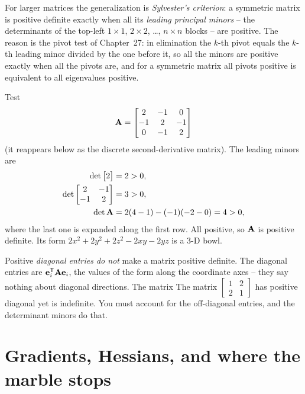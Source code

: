 For larger matrices the generalization is \emph{Sylvester's criterion}: a
symmetric matrix is positive definite exactly when all its \emph{leading principal
minors} -- the determinants of the top-left $1\times1$, $2\times2$, \dots, $n\times
n$ blocks -- are positive. The reason is the pivot test of Chapter~27: in elimination
the $k$-th pivot equals the $k$-th leading minor divided by the one before it, so all
the minors are positive exactly when all the pivots are, and for a symmetric matrix
all pivots positive is equivalent to all eigenvalues positive.

\begin{example}
\label{ch36:ex-minors}
Test
\[
  \mathbf{A}=\begin{bmatrix} 2&-1&0\\ -1&2&-1\\ 0&-1&2\end{bmatrix}
\]
(it reappears below as the discrete second-derivative matrix). The leading minors are
\begin{align*}
  \det\begin{bmatrix}2\end{bmatrix}&=2>0,\\
  \det\begin{bmatrix}2&-1\\-1&2\end{bmatrix}&=3>0,\\
  \det\mathbf{A} &= 2(4-1)-(-1)(-2-0)=4>0,
\end{align*}
where the last one is expanded along the first row. All positive, so $\mathbf{A}$ is
positive definite. Its form $2x^2+2y^2+2z^2-2xy-2yz$ is a $3$-D bowl.
\end{example}

\begin{trapbox}
Positive \emph{diagonal entries do not} make a matrix positive definite. The diagonal
entries are $\mathbf{e}_i^{\mathsf{T}}\mathbf{A}\mathbf{e}_i$, the values of the form along the
coordinate axes -- they say nothing about diagonal directions. The matrix
The matrix $\left[\begin{smallmatrix}1&2\\2&1\end{smallmatrix}\right]$ has positive diagonal yet is indefinite. You
must account for the off-diagonal entries, and the determinant minors do that.
\end{trapbox}

\section{Gradients, Hessians, and where the marble stops}
\label{ch36:gradient-hessian}

